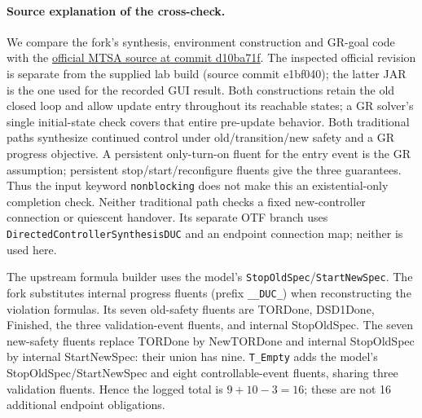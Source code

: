 \documentclass[11pt]{article}
\begin{document}
\paragraph{Source explanation of the cross-check.}
We compare the fork's synthesis, environment construction and GR-goal code with the
\href{https://git.exactas.uba.ar/lafhis/mtsa/-/tree/d10ba71f092dc9645a80d2752bd089691f158156/maven-root/mtsa/src/main/java/ltsa/updatingControllers}{official MTSA source at commit d10ba71f}.
The inspected official revision is separate from the supplied lab build (source commit e1bf040); the latter JAR is the one used for the recorded GUI result.
Both constructions retain the old closed loop and allow update entry throughout its reachable states; a GR solver's single initial-state check covers that entire pre-update behavior. Both traditional paths synthesize continued control under old/transition/new safety and a GR progress objective. A persistent only-turn-on fluent for the entry event is the GR assumption; persistent stop/start/reconfigure fluents give the three guarantees. Thus the input keyword \texttt{nonblocking} does not make this an existential-only completion check. Neither traditional path checks a fixed new-controller connection or quiescent handover. Its separate OTF branch uses \texttt{DirectedController\allowbreak SynthesisDUC} and an endpoint connection map; neither is used here.

The upstream formula builder uses the model's \texttt{StopOldSpec}/\texttt{StartNewSpec}. The fork substitutes internal progress fluents (prefix \texttt{\_\_DUC\_}) when reconstructing the violation formulas. Its seven old-safety fluents are TORDone, DSD1Done, Finished, the three validation-event fluents, and internal StopOldSpec. The seven new-safety fluents replace TORDone by NewTORDone and internal StopOldSpec by internal StartNewSpec: their union has nine. \texttt{T\_Empty} adds the model's StopOldSpec/StartNewSpec and eight controllable-event fluents, sharing three validation fluents. Hence the logged total is $9+10-3=16$; these are not 16 additional endpoint obligations.
\end{document}
